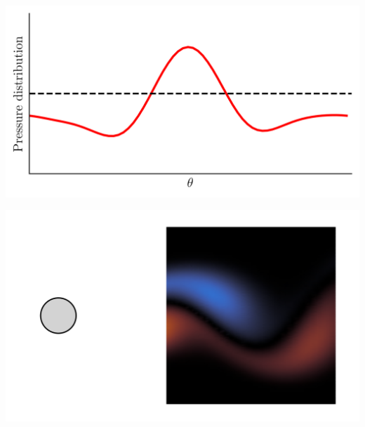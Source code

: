 \documentclass[aspectratio=169, usenames, dvipsnames]{beamer}
\begin{document}
{

\begin{frame}
  \vfill
  \begin{minipage}{.48\textwidth}
    \includegraphics[width=\textwidth]{pressure_distribution}
  \end{minipage}%
  \hfill
  \begin{minipage}{.48\textwidth}
    \includegraphics[width=\textwidth]{cylinder_cca_setup}
  \end{minipage}
  \vfill
\end{frame}

}
\end{document}
